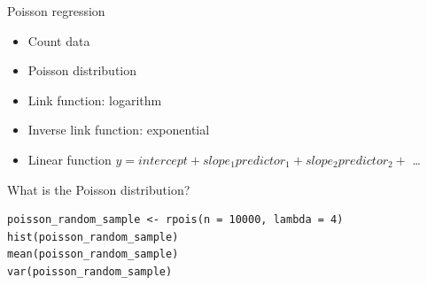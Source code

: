 \documentclass{beamer}
\makeatletter
\newenvironment{kframe}{%
 \def\at@end@of@kframe{}%
 \ifinner\ifhmode%
  \def\at@end@of@kframe{\end{minipage}}%
  \begin{minipage}{\columnwidth}%
 \fi\fi%
 \def\FrameCommand##1{\hskip\@totalleftmargin \hskip-\fboxsep
 \colorbox{shadecolor}{##1}\hskip-\fboxsep
     \hskip-\linewidth \hskip-\@totalleftmargin \hskip\columnwidth}%
 \MakeFramed {\advance\hsize-\width
   \@totalleftmargin\z@ \linewidth\hsize
   \@setminipage}}%
 {\par\unskip\endMakeFramed%
 \at@end@of@kframe}
\newenvironment{knitrout}{}{} %
\makeatother
\begin{document}
\begin{frame}{Poisson regression}
  \begin{itemize}
    \item Count data
    \item Poisson distribution
    \item Link function: logarithm
    \item Inverse link function: exponential
    \item Linear function $y = intercept + slope_1 predictor_1 + slope_2 predictor_2 +$ \dots
  \end{itemize}
\end{frame}


\begin{frame}[fragile]{What is the Poisson distribution?}

    
\begin{knitrout}
\color{fgcolor}\begin{kframe}
\begin{verbatim}
poisson_random_sample <- rpois(n = 10000, lambda = 4)  
hist(poisson_random_sample)
mean(poisson_random_sample)
var(poisson_random_sample)
\end{verbatim}
\end{kframe}
\end{knitrout}

\end{frame}
\end{document}
